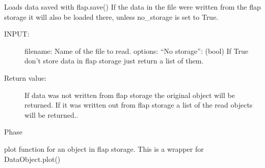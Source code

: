 \documentclass[letterpaper,10pt,english]{sphinxmanual}
\begin{document}
\begin{fulllineitems}
\label{\detokenize{data_object:flap.data_object.load}}
Loads data saved with flap.save()
If the data in the file were written from the flap storage it will also be
loaded there, unless  no\_storage is set to True.
\begin{description}
\item[{INPUT:}] \leavevmode
filename: Name of the file to read.
options: “No storage”: (bool) If True don’t store data in flap storage just return a list of them.

\item[{Return value:}] \leavevmode
If data was not written from flap storage the original object will be returned.
If it was written out from flap storage a list of the read objects will be returned..

\end{description}

\end{fulllineitems}


\begin{fulllineitems}
\label{\detokenize{data_object:flap.data_object.phase}}
Phase

\end{fulllineitems}


\begin{fulllineitems}
\label{\detokenize{data_object:flap.data_object.plot}}
plot function for an object in flap storage. This is a wrapper for DataObject.plot()

\end{fulllineitems}
\end{document}
